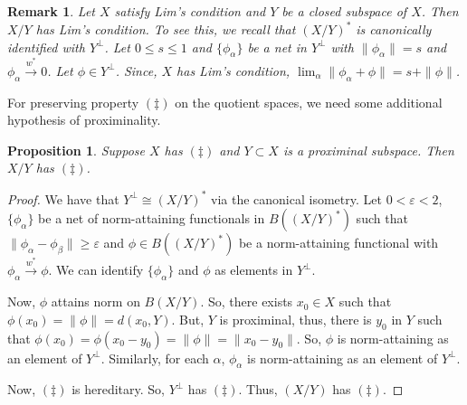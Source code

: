 \documentclass[11pt]{amsart}
\newcommand{\e}{\varepsilon}
\newtheorem{prop}[thm]{Proposition}
\newtheorem{rem}[thm]{Remark}
\begin{document}
\begin{rem}
	Let $X$ satisfy Lim's condition and $Y$ be a closed subspace of $X$. Then $X/Y$ has Lim's condition. To see this, we recall that $(X/Y)^*$ is canonically identified with $Y^\perp$. Let $0 \leq s \leq 1$ and $\{\phi_\alpha\}$ be a net in $Y^\perp$ with $\|\phi_\alpha\|=s$ and $\phi_\alpha \xrightarrow{w^\ast} 0$. Let $\phi \in Y^\perp$. Since, $X$ has Lim's condition, $\lim_\alpha \|\phi_\alpha + \phi\|=s+\|\phi\|$.
\end{rem}

For preserving  property $(\ddag)$ on the quotient spaces, we need some additional hypothesis of proximinality.

\begin{prop}
	Suppose $X$ has $(\ddag)$ and $Y\subset X$ is a proximinal subspace. Then $X/Y$ has $(\ddag)$.	
\end{prop}

\begin{proof}
	We have that $Y^\perp \cong (X/Y)^*$ via the canonical isometry. Let $0 <\e <2$, $\{\phi_\alpha\}$ be a net of norm-attaining functionals in $B((X/Y)^*)$ such that $\|\phi_\alpha - \phi_\beta\| \geq \e$ and $\phi \in B((X/Y)^*)$ be a norm-attaining functional with $\phi_\alpha \xrightarrow{w^\ast} \phi$. We can identify $\{\phi_\alpha\}$ and $\phi$ as elements in $Y^\perp$.
	
	Now, $\phi$ attains norm on $B(X/Y)$. So, there exists $x_0 \in X$ such that $\phi(x_0)=\|\phi\|=d(x_0, Y)$. But, $Y$ is proximinal, thus, there is $y_0$ in $Y$ such that $\phi(x_0)=\phi(x_0-y_0)=\|\phi\|=\|x_0-y_0\|$. So, $\phi$ is norm-attaining as an element of $Y^\perp$. Similarly, for each $\alpha$, $\phi_\alpha$ is norm-attaining as an element of $Y^\perp$.
	
	Now, $(\ddag)$ is hereditary. So, $Y^\perp$ has $(\ddag)$. Thus, $(X/Y)$ has $(\ddag)$.
\end{proof}
\end{document}
